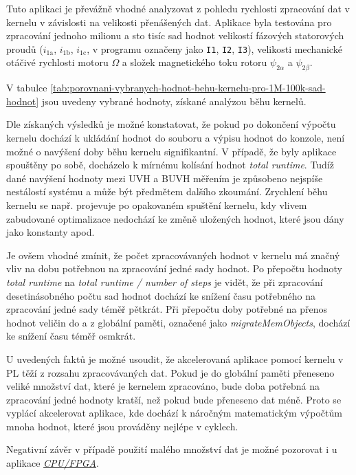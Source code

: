 \documentclass[a4paper, twoside, 11pt]{article}
\begin{document}
		Tuto aplikaci je převážně vhodné analyzovat z pohledu rychlosti zpracování dat v kernelu v závislosti na velikosti přenášených dat. Aplikace byla testována pro zpracování jednoho milionu a sto tisíc sad hodnot velikostí fázových statorových proudů ($i_\text{1a}$, $i_\text{1b}$, $i_\text{1c}$, v programu označeny jako \texttt{I1}, \texttt{I2}, \texttt{I3}), velikosti mechanické otáčivé rychlosti motoru $\Omega$ a složek magnetického toku rotoru $\psi_{2\alpha}$ a $\psi_{2\beta}$.\par
		V tabulce \ref{tab:porovnani-vybranych-hodnot-behu-kernelu-pro-1M-100k-sad-hodnot} jsou uvedeny vybrané hodnoty, získané analýzou běhu kernelů.\par
		Dle získaných výsledků je možné konstatovat, že pokud po dokončení výpočtu kernelu dochází k ukládání hodnot do souboru a výpisu hodnot do konzole, není možné o navýšení doby běhu kernelu signifikantní. V případě, že byly aplikace spouštěny po sobě, docházelo k mírnému kolísání hodnot \textit{total runtime}. Tudíž dané navýšení hodnoty mezi UVH a BUVH měřením je způsobeno nejspíše nestálostí systému a může být předmětem dalšího zkoumání. Zrychlení běhu kernelu se např. projevuje po opakovaném spuštění kernelu, kdy vlivem zabudované optimalizace nedochází ke změně uložených hodnot, které jsou dány jako konstanty apod.\par
		Je ovšem vhodné zmínit, že počet zpracovávaných hodnot v kernelu má značný vliv na dobu potřebnou na zpracování jedné sady hodnot. Po přepočtu hodnoty \textit{total runtime} na \textit{total runtime / number of steps}  je vidět, že při zpracování desetinásobného počtu sad hodnot dochází ke snížení času potřebného na zpracování jedné sady téměř pětkrát. Při přepočtu doby potřebné na přenos hodnot veličin do a z globální paměti, označené jako \textit{migrateMemObjects}, dochází ke snížení času téměř osmkrát.\par
		U uvedených faktů je možné usoudit, že akcelerovaná aplikace pomocí kernelu v PL těží z rozsahu zpracovávaných dat. Pokud je do globální paměti přeneseno veliké množství dat, které je kernelem zpracováno, bude doba potřebná na zpracování jedné hodnoty kratší, než pokud bude přeneseno dat méně. Proto se vyplácí akcelerovat aplikace, kde dochází k náročným matematickým výpočtům mnoha hodnot, které jsou prováděny nejlépe v cyklech.\par
		Negativní závěr v případě použití malého množství dat je možné pozorovat i u aplikace \hyperref[subsec:dosazene-vysledky-cpu-fpga]{\textit{CPU/FPGA}}.\par
\end{document}
